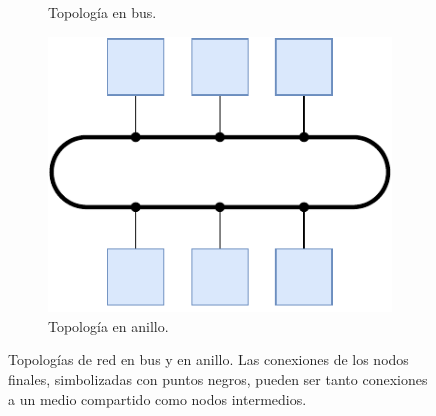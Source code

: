 \begin{figure}[p]
    \centering
    \begin{subfigure}[t]{.4\textwidth}
        \caption{Topología en bus.}
    \end{subfigure} %
    \hfill %
    \begin{subfigure}[t]{.4\textwidth}
        \includegraphics{images/diagrams/topology_ring.drawio.pdf}
        \caption{Topología en anillo.}
        \label{fig:topology_ring}
    \end{subfigure}
    \caption[Topologías de red en bus y en anillo.]{Topologías de red en bus y en anillo. Las conexiones de los nodos finales, simbolizadas con puntos negros, pueden ser tanto conexiones a un medio compartido como nodos intermedios.}
    \label{fig:topology_busring}
\end{figure}

